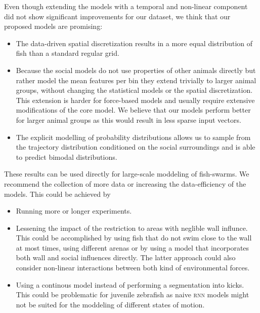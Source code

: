 \documentclass[nobib, a4paper]{tufte-handout}
\begin{document}
Even though extending the models with a temporal and non-linear component did not show significant improvements for our dataset, we think that our proposed models are promising:
\begin{itemize}
\item The data-driven spatial discretization results in a more equal distribution of fish than a standard regular grid.
\item Because the social models do not use properties of other animals directly but rather model the mean features per bin they extend trivially to larger animal groups, without changing the statistical models or the spatial discretization.
  This extension is harder for force-based models and usually require extensive modifications of the core model.
  We believe that our models perform better for larger animal groups as this would result in less sparse input vectors.
\item The explicit modelling of probability distributions allows us to sample from the trajectory distribution conditioned on the social surroundings and is able to predict bimodal distributions.
\end{itemize}
These results can be used directly for large-scale moddeling of fish-swarms.
We recommend the collection of more data or increasing the data-efficiency of the models.
This could be achieved by
\begin{itemize}
\item Running more or longer experiments.
\item Lessening the impact of the restriction to areas with neglible wall influnce.
  This could be accomplished by using fish that do not swim close to the wall at most times, using different arenas or by using a model that incorporates both wall and social influences directly.
  The latter approach could also consider non-linear interactions between both kind of environmental forces.
\item Using a continous model instead of performing a segmentation into kicks.
  This could be problematic for juvenile zebrafish as naive \textsc{rnn} models might not be suited for the moddeling of different states of motion.
\end{itemize}

\printbibliography
\end{document}
